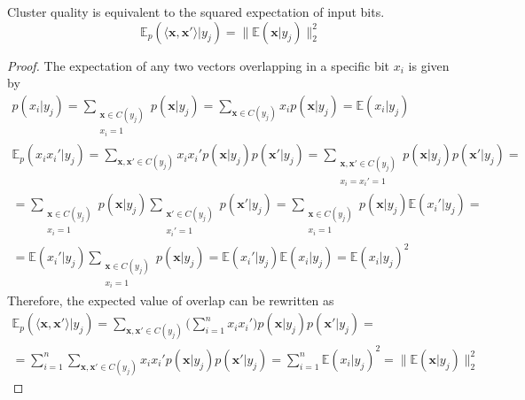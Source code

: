 \documentclass[oneside,english,logo]{amuthesis}
\begin{document}
\begin{theorem}
Cluster quality is equivalent to the squared expectation of input bits.  
\[\mathbb{E}_p(\langle \boldsymbol{x}, \boldsymbol{x}'\rangle|y_j) = \lVert \mathbb{E}(\boldsymbol{x}|y_j) \rVert_2^2\]
\end{theorem}
\begin{proof}
The expectation of any two vectors overlapping in a specific bit $x_i$ is given by
\begin{gather*}
p(x_i|y_j) = \sum_{\substack{\boldsymbol{x}\in C(y_j)\\x_i=1}} p(\boldsymbol{x}|y_j)	= \sum_{\boldsymbol{x}\in C(y_j)} x_i p(\boldsymbol{x}|y_j)	= \mathbb{E}(x_i|y_j)\\
\mathbb{E}_p(x_i x_i' | y_j) = \sum_{\boldsymbol{x},\boldsymbol{x}'\in C(y_j)}  x_i x_i' p(\boldsymbol{x}|y_j)p(\boldsymbol{x}'|y_j) = 	\sum_{\substack{\boldsymbol{x},\boldsymbol{x}'\in C(y_j) \\ x_i=x_i'=1}} p(\boldsymbol{x}|y_j)p(\boldsymbol{x}'|y_j) = \\
= \sum_{\substack{\boldsymbol{x}\in C(y_j) \\ x_i=1}} p(\boldsymbol{x}|y_j) \sum_{\substack{\boldsymbol{x}'\in C(y_j) \\ x_i'=1}} p(\boldsymbol{x}'|y_j) = 
\sum_{\substack{\boldsymbol{x}\in C(y_j) \\ x_i=1}} p(\boldsymbol{x}|y_j) \mathbb{E}(x_i'|y_j)= \\
= \mathbb{E}(x_i'|y_j) \sum_{\substack{\boldsymbol{x}\in C(y_j) \\ x_i=1}} p(\boldsymbol{x}|y_j) = \mathbb{E}(x_i'|y_j) \mathbb{E}(x_i|y_j) = \mathbb{E}(x_i|y_j)^2
\end{gather*}
Therefore, the expected value of overlap can be rewritten as  
\begin{gather*}
\mathbb{E}_p(\langle \boldsymbol{x}, \boldsymbol{x}'\rangle|y_j) =  \sum_{\boldsymbol{x},\boldsymbol{x}'\in C(y_j)} \big(\sum_{i=1}^n x_i x_i'\big)  p(\boldsymbol{x}|y_j)p(\boldsymbol{x}'|y_j) = \\
= \sum_{i=1}^n \sum_{\boldsymbol{x},\boldsymbol{x}'\in C(y_j)}  x_i x_i'  p(\boldsymbol{x}|y_j)p(\boldsymbol{x}'|y_j) = \sum_{i=1}^n \mathbb{E}(x_i|y_j)^2 = \lVert \mathbb{E}(\boldsymbol{x}|y_j) \rVert_2^2
\end{gather*}
\end{proof}
\end{document}
